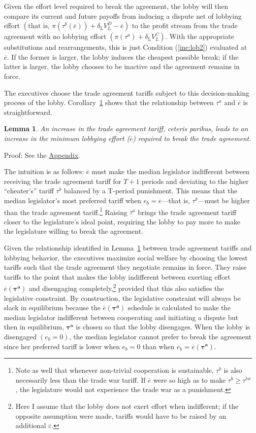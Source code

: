 \documentclass[authoryear, review]{elsarticle}
\newtheorem{lemma}{Lemma}
\newcommand{\ov}{\overline}
\newcommand{\bta}{\bm{\tau^a}}
\newcommand{\de}{\delta}
\begin{document}
Given the effort level required to break the agreement, the lobby will then compare its current and future payoffs from inducing a dispute net of lobbying effort $\left(\text{that is, }\pi(\tau^b(\ov{e})) + \de_\text{L} V^D_L - \ov{e}\right)$ to the profit stream from the trade agreement with no lobbying effort $\left(\pi(\tau^a) + \de_\text{L} V^C_L\right)$. With the appropriate substitutions and rearrangements, this is just Condition (\ref{ine:lob2}) evaluated at $\ov{e}$. If the former is larger, the lobby induces the cheapest possible break; if the latter is larger, the lobby chooses to be inactive and the agreement remains in force.

The executives choose the trade agreement tariffs subject to this decision-making process of the lobby. Corollary~\ref{cor:et} shows that the relationship between $\tau^a$ and $\ov{e}$ is straightforward. 
\begin{lemma}
  An increase in the trade agreement tariff, \emph{ceteris paribus}, leads to an increase in the minimum lobbying effort ($\ov{e}$) required to break the trade agreement.
  \label{cor:et}
\end{lemma}

Proof: See the \hyperlink{Cor_et}{Appendix}.

\noindent The intuition is as follows: $\ov{e}$ must make the median legislator indifferent between receiving the trade agreement tariff for $T+1$ periods and deviating to the higher ``cheater's'' tariff $\tau^b$ balanced by a T-period punishment. This means that the median legislator's most preferred tariff when $e_b=\ov{e}$---that is, $\tau^b$---must be higher than the trade agreement tariff.\footnote{Note as well that whenever non-trivial cooperation is sustainable, $\tau^b$ is also necessarily less than the trade war tariff. If $\ov{e}$ were so high as to make $\tau^b \geq \tau^{tw}$, the legislature would not experience the trade war as a punishment.} Raising $\tau^a$ brings the trade agreement tariff closer to the legislature's ideal point, requiring the lobby to pay more to make the legislature willing to break the agreement.

Given the relationship identified in Lemma~\ref{cor:et} between trade agreement tariffs and lobbying behavior, the executives maximize social welfare by choosing the lowest tariffs such that the trade agreement they negotiate remains in force. They raise tariffs to the point that makes the lobby indifferent between exerting effort $\ov{e}(\bta)$ and disengaging completely,\footnote{Here I assume that the lobby does not exert effort when indifferent; if the opposite assumption were made, tariffs would have to be raised by an additional $\varepsilon$.} provided that this also satisfies the legislative constraint. By construction, the legislative constraint will always be slack in equilibrium because the $\ov{e}(\bta)$ schedule is calculated to make the median legislator indifferent between cooperating and initiating a dispute but then in equilibrium, $\bta$ is chosen so that the lobby disengages. When the lobby is disengaged $\left(e_b=0\right)$, the median legislator cannot prefer to break the agreement since her preferred tariff is lower when $e_b=0$ than when $e_b=\ov{e}(\bta)$.
\end{document}
